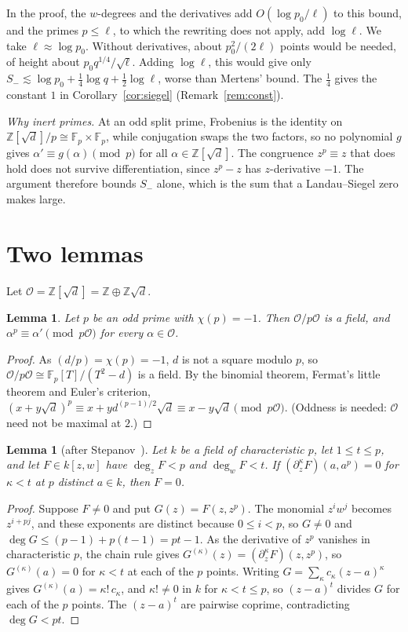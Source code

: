 \documentclass[11pt]{amsart}
\newtheorem{lemma}[theorem]{Lemma}
\theoremstyle{remark}
\newcommand{\Z}{\mathbb{Z}}
\newcommand{\F}{\mathbb{F}}
\newcommand{\cO}{\mathcal{O}}
\newcommand{\sd}{\sqrt{d}}
\begin{document}
In the proof, the $w$-degrees and the derivatives add $O(\log p_0/\ell)$ to this bound, and the primes
$p\le\ell$, to which the rewriting does not apply, add $\log\ell$. We take $\ell\approx\log p_0$. Without derivatives, about $p_0^2/(2\ell)$ points would be needed,
of height about $p_0q^{1/4}/\sqrt\ell$. Adding $\log\ell$, this would give only
$S_-\lesssim\log p_0+\frac14\log q+\frac12\log\ell$, worse than Mertens' bound. The $\frac14$ gives the
constant $1$ in Corollary~\ref{cor:siegel} (Remark~\ref{rem:const}).

\emph{Why inert primes.} At an odd split prime, Frobenius is the identity on $\Z[\sd]/p\cong\F_p\times\F_p$,
while conjugation swaps the two factors, so no polynomial $g$ gives $\alpha'\equiv g(\alpha)\pmod p$ for all $\alpha\in\Z[\sd]$. The
congruence $z^p\equiv z$ that does hold does not survive differentiation, since $z^p-z$ has $z$-derivative
$-1$. The argument therefore bounds $S_-$ alone, which is the sum that a Landau--Siegel zero makes large.


\section{Two lemmas}\label{sec:lemmas}

Let $\cO=\Z[\sd]=\Z\oplus\Z\sd$.

\begin{lemma}\label{lem:frob}
Let $p$ be an odd prime with $\chi(p)=-1$. Then $\cO/p\cO$ is a field, and
$\alpha^p\equiv\alpha'\pmod{p\cO}$ for every $\alpha\in\cO$.
\end{lemma}

\begin{proof}
As $(d/p)=\chi(p)=-1$, $d$ is not a square modulo $p$, so $\cO/p\cO\cong\F_p[T]/(T^2-d)$ is a field. By the binomial theorem, Fermat's little
theorem and Euler's criterion, $(x+y\sd)^p\equiv x+yd^{(p-1)/2}\sd\equiv x-y\sd\pmod{p\cO}$. (Oddness is needed: $\cO$ need not be
maximal at $2$.)
\end{proof}

\begin{lemma}[after Stepanov~\cite{Stepanov}]\label{lem:stepanov}
Let $k$ be a field of characteristic $p$, let $1\le t\le p$, and let $F\in k[z,w]$ have $\deg_zF<p$
and $\deg_wF<t$. If $(\partial_z^\kappa F)(a,a^p)=0$ for $\kappa<t$ at $p$ distinct $a\in k$, then $F=0$.
\end{lemma}

\begin{proof}
Suppose $F\ne0$ and put $G(z)=F(z,z^p)$. The monomial $z^iw^j$ becomes $z^{i+pj}$, and these
exponents are distinct because $0\le i<p$, so $G\ne0$ and $\deg G\le(p-1)+p(t-1)=pt-1$. As the
derivative of $z^p$ vanishes in characteristic $p$, the chain rule gives
$G^{(\kappa)}(z)=(\partial_z^\kappa F)(z,z^p)$, so $G^{(\kappa)}(a)=0$ for $\kappa<t$ at each of the
$p$ points. Writing $G=\sum_\kappa c_\kappa(z-a)^\kappa$ gives $G^{(\kappa)}(a)=\kappa!\,c_\kappa$, and
$\kappa!\ne0$ in $k$ for $\kappa<t\le p$, so $(z-a)^t$ divides $G$ for each of the $p$ points. The $(z-a)^t$ are pairwise coprime, contradicting
$\deg G<pt$.
\end{proof}
\end{document}
